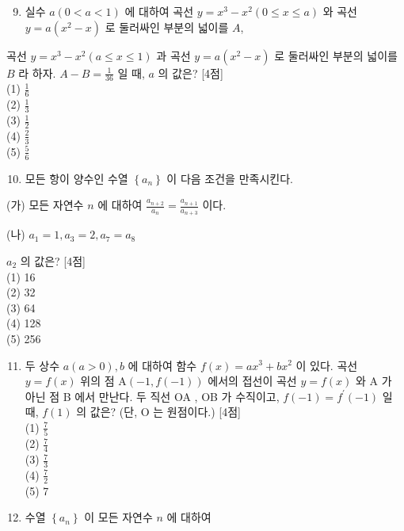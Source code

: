 \documentclass[10pt]{article}
\begin{document}
\begin{enumerate}
  \setcounter{enumi}{8}
  \item 실수 \(a(0<a<1)\) 에 대하여 곡선 \(y=x^{3}-x^{2}(0 \leq x \leq a)\) 와 곡선 \(y=a\left(x^{2}-x\right)\) 로 둘러싸인 부분의 넓이를 \(A\),
\end{enumerate}

곡선 \(y=x^{3}-x^{2}(a \leq x \leq 1)\) 과 곡선 \(y=a\left(x^{2}-x\right)\) 로 둘러싸인 부분의 넓이를 \(B\) 라 하자. \(A-B=\frac{1}{36}\) 일 때, \(a\) 의 값은? [4점]\\
(1) \(\frac{1}{6}\)\\
(2) \(\frac{1}{3}\)\\
(3) \(\frac{1}{2}\)\\
(4) \(\frac{2}{3}\)\\
(5) \(\frac{5}{6}\)

\begin{enumerate}
  \setcounter{enumi}{9}
  \item 모든 항이 양수인 수열 \(\left\{a_{n}\right\}\) 이 다음 조건을 만족시킨다.
\end{enumerate}

(가) 모든 자연수 \(n\) 에 대하여 \(\frac{a_{n+2}}{a_{n}}=\frac{a_{n+1}}{a_{n+3}}\) 이다.

(나) \(a_{1}=1, a_{3}=2, a_{7}=a_{8}\)

\(a_{2}\) 의 값은? [4점]\\
(1) 16\\
(2) 32\\
(3) 64\\
(4) 128\\
(5) 256

\begin{enumerate}
  \setcounter{enumi}{10}
  \item 두 상수 \(a(a>0), b\) 에 대하여 함수 \(f(x)=a x^{3}+b x^{2}\) 이 있다. 곡선 \(y=f(x)\) 위의 점 \(\mathrm{A}(-1, f(-1))\) 에서의 접선이 곡선 \(y=f(x)\) 와 A 가 아닌 점 B 에서 만난다. 두 직선 OA , OB 가 수직이고, \(f(-1)=f^{\prime}(-1)\) 일 때, \(f(1)\) 의 값은? (단, O 는 원점이다.) [4점]\\
(1) \(\frac{7}{5}\)\\
(2) \(\frac{7}{4}\)\\
(3) \(\frac{7}{3}\)\\
(4) \(\frac{7}{2}\)\\
(5) 7

  \item 수열 \(\left\{a_{n}\right\}\) 이 모든 자연수 \(n\) 에 대하여

\end{enumerate}
\end{document}
